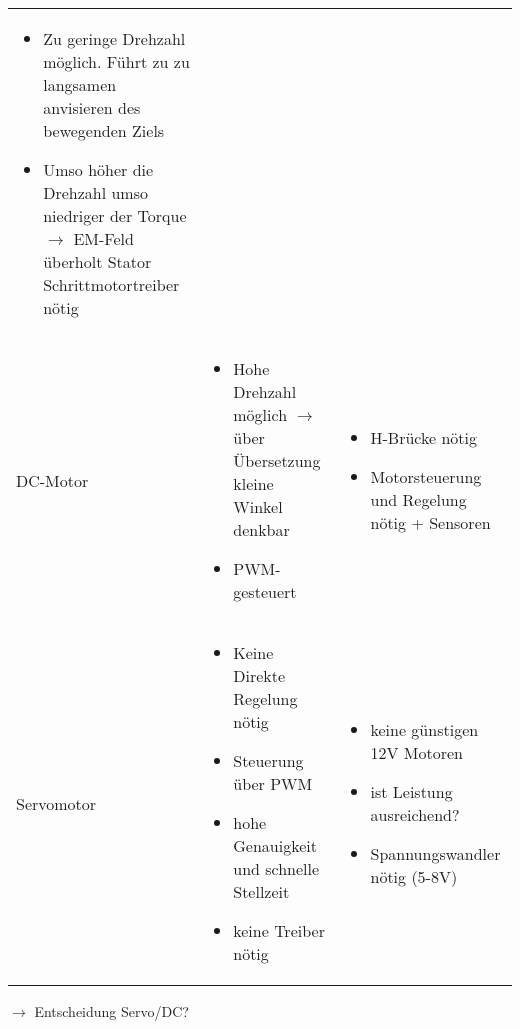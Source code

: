 \begin{longtable}{ p{}|p{}|p{} }
\begin{itemize}
	\item Zu geringe Drehzahl möglich. Führt zu zu langsamen anvisieren des bewegenden Ziels
	\item Umso höher die Drehzahl umso niedriger der Torque $\rightarrow$ EM-Feld überholt Stator Schrittmotortreiber nötig
    \end{itemize}
\\
    DC-Motor &
    \begin{itemize}
        \item Hohe Drehzahl möglich $\rightarrow$ über Übersetzung kleine Winkel denkbar
        \item PWM-gesteuert
    \end{itemize}
    &
    \begin{itemize}
        \item H-Brücke nötig
        \item Motorsteuerung und Regelung nötig + Sensoren
    \end{itemize}
    \\
    Servomotor &
    \begin{itemize}
        \item Keine Direkte Regelung nötig
        \item Steuerung über PWM
        \item hohe Genauigkeit und schnelle Stellzeit
        \item keine Treiber nötig
    \end{itemize}
    &
    \begin{itemize}
        \item keine günstigen 12V Motoren
        \item ist Leistung ausreichend?
        \item Spannungswandler nötig (5-8V)
    \end{itemize}
    \\
\end{longtable}

$\rightarrow$ Entscheidung Servo/DC?

